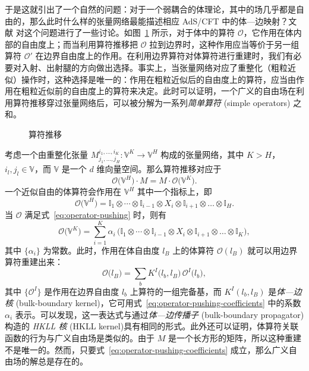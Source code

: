 于是这就引出了一个自然的问题：对于一个弱耦合的体理论，其中的场几乎都是自由的，那么此时什么样的张量网络最能描述相应 AdS/CFT 中的体—边映射？文献 \parencite{bhattacharyya2018tensor} 对这个问题进行了一些讨论。如图~\ref{fig:operator-pushing} 所示，对于体中的算符 $\mathcal{O}$，它作用在体内部的自由度上；而当利用算符推移把 $\mathcal{O}$ 拉到边界时，这种作用应当等价于另一组算符 $\mathcal{O}'$ 在边界自由度上的作用。在利用边界算符对体算符进行重建时，我们有必要对入射、出射腿的方向做出选择。事实上，当张量网络对应了重整化（粗粒近似）操作时，这种选择是唯一的：作用在粗粒近似后的自由度上的算符，应当由作用在粗粒近似前的自由度上的算符来决定。此时可以证明，一个广义的自由场在利用算符推移穿过张量网络后，可以被分解为一系列\emph{简单算符} (simple operators) 之和\cite{bhattacharyya2018tensor}。

\begin{figure}[htb]
  \centering
  \caption{算符推移}
  \label{fig:operator-pushing}
\end{figure}

考虑一个由重整化张量 $M^{i_1,\dots,i_K}_{j_1,\dots,j_H}\colon\mathbb{V}^K\to\mathbb{V}^H$ 构成的张量网络，其中 $K>H$，$i_l,j_l\in\mathbb{V}$，而 $\mathbb{V}$ 是一个 $d$ 维向量空间。那么算符推移对应于
\begin{equation}
  \mathcal{O} \bigl( \mathbb{V}^H \bigr) \cdot M = M \cdot \mathcal{O} \bigl( \mathbb{V}^K \bigr).
  \label{eq:operator-pushing}
\end{equation}
一个近似自由的体算符会作用在 $\mathbb{V}^H$ 其中一个指标上，即
\begin{equation}
    \mathcal{O} \bigl( \mathbb{V}^H \bigr)
  = \mathbb{I}_1 \otimes \cdots \otimes \mathbb{I}_{i-1} \otimes X_i \otimes \mathbb{I}_{i+1} \otimes \dots \otimes \mathbb{I}_{H}.
\end{equation}
当 $\mathcal{O}$ 满足式~\eqref{eq:operator-pushing} 时，则有
\begin{equation}
    \mathcal{O} \bigl( \mathbb{V}^K \bigr)
  = \sum_{i=1}^K \alpha_i \, \bigl(
      \mathbb{I}_1 \otimes \cdots \otimes \mathbb{I}_{i-1} \otimes X_i \otimes \mathbb{I}_{i+1} \otimes \dots \otimes \mathbb{I}_{K}
    \bigr),
  \label{eq:operator-pushing-coefficients}
\end{equation}
其中 $\{\alpha_i\}$ 为常数。此时，作用在体自由度 $l_B$ 上的体算符 $\mathcal{O}(l_B)$ 就可以用边界算符重建出来：
\begin{equation}
  \mathcal{O} \bigl( l_B \bigr) = \sum_b K^I \bigl( l_b, l_B \bigr) \, \mathcal{O}^I \bigl( l_b \bigr),
\end{equation}
其中 $\{\mathcal{O}^I\}$ 是作用在边界自由度 $l_b$ 上算符的一组完备基，而 $K^I(l_b, l_B)$ 是\emph{体—边核} (bulk-boundary kernel)，它可用式~\eqref{eq:operator-pushing-coefficients} 中的系数 $\alpha_i$ 表示。可以发现，这一表达式与通过\emph{体—边传播子} (bulk-boundary propagator) 构造的 \emph{HKLL 核} (HKLL kernel)\cite{hamilton2006local,hamilton2006holographic}具有相同的形式。此外还可以证明，体算符关联函数的行为与广义自由场是类似的\cite{bhattacharyya2018tensor,hung2019padic}。由于 $M$ 是一个长方形的矩阵，所以这种重建不是唯一的。然而，只要式~\eqref{eq:operator-pushing-coefficients} 成立，那么广义自由场的解总是存在的。

